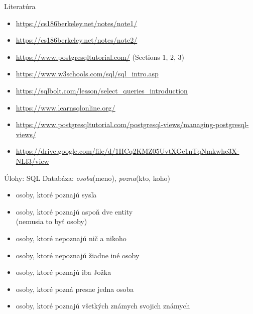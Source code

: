 \documentclass[12pt]{beamer}
\begin{document}
\begin{frame}{Literatúra}
\begin{itemize}
\item {\scriptsize\url{https://cs186berkeley.net/notes/note1/}}
\item {\scriptsize\url{https://cs186berkeley.net/notes/note2/}}
\item {\scriptsize\url{https://www.postgresqltutorial.com/} (Sections 1, 2, 3)}
\item {\scriptsize\url{https://www.w3schools.com/sql/sql_intro.asp}}
\item {\scriptsize\url{https://sqlbolt.com/lesson/select_queries_introduction}}
\item {\scriptsize\url{https://www.learnsqlonline.org/}}
\item {\scriptsize\url{https://www.postgresqltutorial.com/postgresql-views/managing-postgresql-views/}}
\item {\scriptsize\url{https://drive.google.com/file/d/1HCq2KMZ05UvtXGe1nTqNmkwhc3X-NLI3/view}}
\end{itemize}
\end{frame}


\begin{frame}{Úlohy: SQL}
Databáza: \emph{osoba}(meno), \emph{pozna}(kto, koho)
\begin{itemize}
    \item osoby, ktoré poznajú sysľa
    \item osoby, ktoré poznajú aspoň dve entity\\ (nemusia to byť osoby)
    \item osoby, ktoré nepoznajú nič a nikoho
    \item osoby, ktoré nepoznajú žiadne iné osoby
    \item osoby, ktoré poznajú iba Jožka
    \item osoby, ktoré pozná presne jedna osoba
    \item osoby, ktoré poznajú všetkých známych svojich známych
\end{itemize}
\end{frame}
\end{document}
